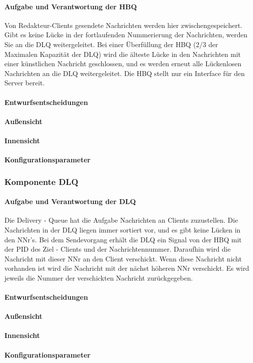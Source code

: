 \documentclass{article}
\begin{document}
			\paragraph{Aufgabe und Verantwortung der HBQ}
				Von Redakteur-Clients gesendete Nachrichten werden hier zwischengespeichert. Gibt es keine Lücke in der fortlaufenden Nummerierung der Nachrichten, werden Sie an die DLQ weitergeleitet. Bei einer Überfüllung der HBQ (2/3 der Maximalen Kapazität der DLQ) wird die älteste Lücke in den Nachrichten mit einer künstlichen Nachricht geschlossen, und es werden erneut alle Lückenlosen Nachrichten an die DLQ weitergeleitet. Die HBQ stellt nur ein Interface für den Server bereit.
			\paragraph{Entwurfsentscheidungen}
			\paragraph{Außensicht}
			\paragraph{Innensicht}
			\paragraph{Konfigurationsparameter}
			
		\subsubsection{Komponente DLQ}
			\paragraph{Aufgabe und Verantwortung der DLQ}
				Die Delivery - Queue hat die Aufgabe Nachrichten an Clients zuzustellen. 
				Die Nachrichten in der DLQ liegen immer sortiert vor, und es gibt keine Lücken in den NNr’s.
				Bei dem Sendevorgang erhält die DLQ ein Signal von der HBQ mit der PID des Ziel - Clients und der Nachrichtennummer. Daraufhin wird die Nachricht mit dieser NNr an den Client verschickt.
				Wenn diese Nachricht nicht vorhanden ist wird die Nachricht mit der nächst höheren NNr verschickt. 
				Es wird jeweils die Nummer der verschickten Nachricht zurückgegeben.
			\paragraph{Entwurfsentscheidungen}
			\paragraph{Außensicht}
			\paragraph{Innensicht}
			\paragraph{Konfigurationsparameter}
\end{document}
